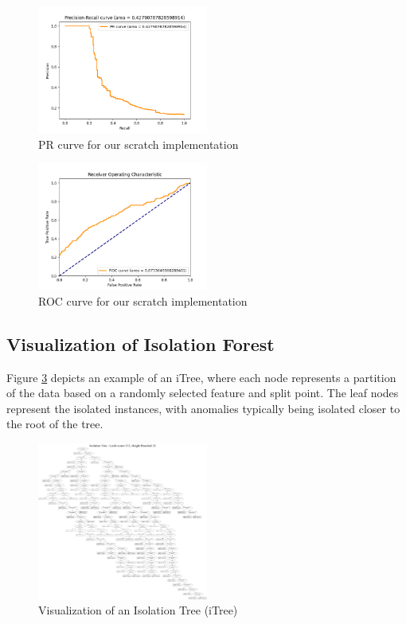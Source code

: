 \begin{figure}[htbp]
\centering
\includegraphics[width=0.5\textwidth]{resources/images/scratch_pr_curve.png}
\caption{PR curve for our scratch implementation}
\label{fig:scratch_pr}
\end{figure}

\begin{figure}[htbp]
\centering
\includegraphics[width=0.5\textwidth]{resources/images/scratch_roc_curve.png}
\caption{ROC curve for our scratch implementation}
\label{fig:scratch_roc}
\end{figure}

\subsection{Visualization of Isolation Forest}
Figure \ref{fig:itree} depicts an example of an iTree, where each node represents a partition of the data based on a randomly selected feature and split point. The leaf nodes represent the isolated instances, with anomalies typically being isolated closer to the root of the tree.

\begin{figure}[htbp]
\centering
\includegraphics[width=0.5\textwidth]{resources/images/itree_graph.png}
\caption{Visualization of an Isolation Tree (iTree)}
\label{fig:itree}
\end{figure}

